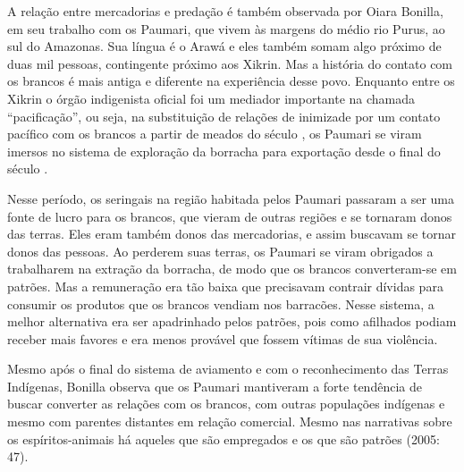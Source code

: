 A relação entre mercadorias e predação é também observada por Oiara
Bonilla, em seu trabalho com os Paumari, que vivem às margens do médio
rio Purus, ao sul do Amazonas. Sua língua é o Arawá e eles também somam
algo próximo de duas mil pessoas, contingente próximo aos Xikrin. Mas a
história do contato com os brancos é mais antiga e diferente na
experiência desse povo. Enquanto entre os Xikrin o órgão indigenista
oficial foi um mediador importante na chamada ``pacificação'', ou seja,
na substituição de relações de inimizade por um contato pacífico com os
brancos a partir de meados do século , os Paumari se viram imersos no
sistema de exploração da borracha para exportação desde o final do
século .

Nesse período, os seringais na região habitada pelos Paumari passaram a
ser uma fonte de lucro para os brancos, que vieram de outras regiões e
se tornaram donos das terras. Eles eram também donos das mercadorias, e
assim buscavam se tornar donos das pessoas. Ao perderem suas terras, os
Paumari se viram obrigados a trabalharem na extração da borracha, de
modo que os brancos converteram-se em patrões. Mas a remuneração era
tão baixa que precisavam contrair dívidas para consumir os produtos que
os brancos vendiam nos barracões. Nesse sistema, a melhor alternativa
era ser apadrinhado pelos patrões, pois como afilhados podiam receber
mais favores e era menos provável que fossem vítimas de sua violência.

Mesmo após o final do sistema de aviamento e com o reconhecimento das
Terras Indígenas, Bonilla observa que os Paumari mantiveram a forte
tendência de buscar converter as relações com os brancos, com outras
populações indígenas e mesmo com parentes distantes em relação
comercial. Mesmo nas narrativas sobre os espíritos-animais há aqueles
que são empregados e os que são patrões (2005: 47).

